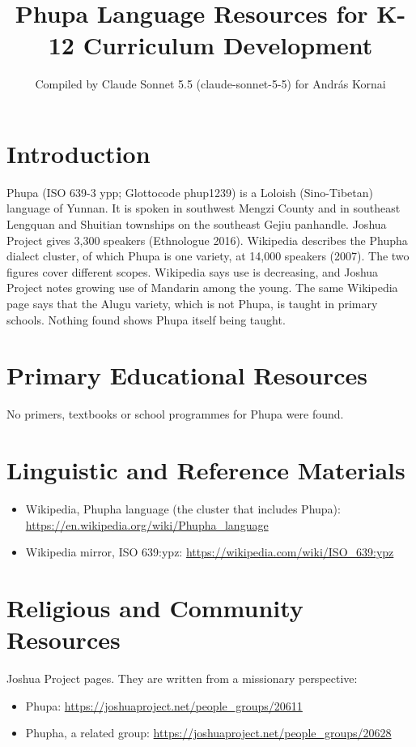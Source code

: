 \documentclass[12pt]{article}
\title{Phupa Language Resources for K-12 Curriculum Development}
\author{Compiled by Claude Sonnet 5.5 (claude-sonnet-5-5) for Andr\'as Kornai}
\date{}
\begin{document}
\maketitle

\section{Introduction}
Phupa (ISO 639-3 ypp; Glottocode phup1239) is a Loloish (Sino-Tibetan) language of Yunnan. It is spoken in southwest Mengzi County and in southeast Lengquan and Shuitian townships on the southeast Gejiu panhandle. Joshua Project gives 3,300 speakers (Ethnologue 2016). Wikipedia describes the Phupha dialect cluster, of which Phupa is one variety, at 14,000 speakers (2007). The two figures cover different scopes. Wikipedia says use is decreasing, and Joshua Project notes growing use of Mandarin among the young. The same Wikipedia page says that the Alugu variety, which is not Phupa, is taught in primary schools. Nothing found shows Phupa itself being taught.

\section{Primary Educational Resources}
No primers, textbooks or school programmes for Phupa were found.

\section{Linguistic and Reference Materials}
\begin{itemize}
\item Wikipedia, Phupha language (the cluster that includes Phupa): \url{https://en.wikipedia.org/wiki/Phupha_language}
\item Wikipedia mirror, ISO 639:ypz: \url{https://wikipedia.com/wiki/ISO_639:ypz}
\end{itemize}

\section{Religious and Community Resources}
Joshua Project pages. They are written from a missionary perspective:
\begin{itemize}
\item Phupa: \url{https://joshuaproject.net/people_groups/20611}
\item Phupha, a related group: \url{https://joshuaproject.net/people_groups/20628}
\end{itemize}
\end{document}
